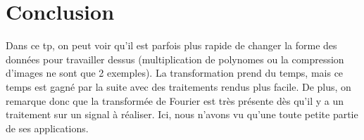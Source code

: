 \documentclass{article}
\begin{document}
\section{Conclusion}
Dans ce tp, on peut voir qu'il est parfois plus rapide de changer la forme des données pour travailler dessus (multiplication de polynomes ou la compression d'images ne sont que 2 exemples). La transformation prend du temps, mais ce temps est gagné par la suite avec des traitements rendus plus facile.
De plus, on remarque donc que la transformée de Fourier est très présente dès qu'il y a un traitement sur un signal à réaliser. Ici, nous n'avons vu qu'une toute petite partie de ses applications.
\end{document}
